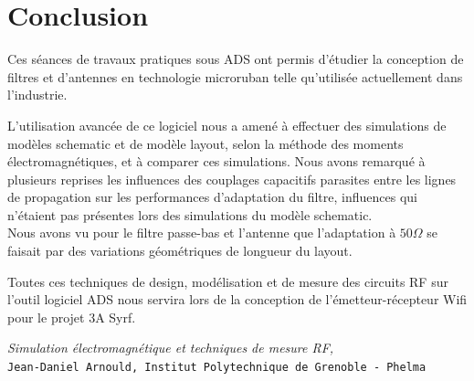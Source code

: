 \documentclass[a4paper]{article}
\begin{document}
\section{Conclusion}

Ces s\'eances de travaux pratiques sous ADS ont permis d'\'etudier la conception de filtres et
 d'antennes en technologie microruban telle qu'utilis\'ee actuellement dans l'industrie.

L'utilisation avanc\'ee de ce logiciel nous a amen\'e \`a effectuer des simulations de mod\`eles schematic et de mod\`ele layout, selon la m\'ethode des
 moments \'electromagn\'etiques, et \`a comparer ces simulations. Nous avons remarqu\'e \`a plusieurs reprises les influences des couplages capacitifs
parasites entre les lignes de propagation sur les performances d'adaptation du filtre, influences qui n'\'etaient pas pr\'esentes lors des simulations
du mod\`ele schematic.\\

Nous avons vu pour le filtre passe-bas et l'antenne que l'adaptation \`a $50 \Omega$ se faisait par des variations g\'eom\'etriques de longueur du layout.

Toutes ces techniques de design, mod\'elisation et de mesure des circuits RF sur l'outil logiciel ADS nous servira lors de la conception de
 l'\'emetteur-r\'ecepteur Wifi pour le projet 3A Syrf.

\clearpage
{}

\begin{thebibliography}{9}

\textit{Simulation \'electromagn\'etique et techniques de mesure RF,}\\
\texttt{Jean-Daniel Arnould, Institut Polytechnique de Grenoble - Phelma}

\end{thebibliography}
\end{document}
